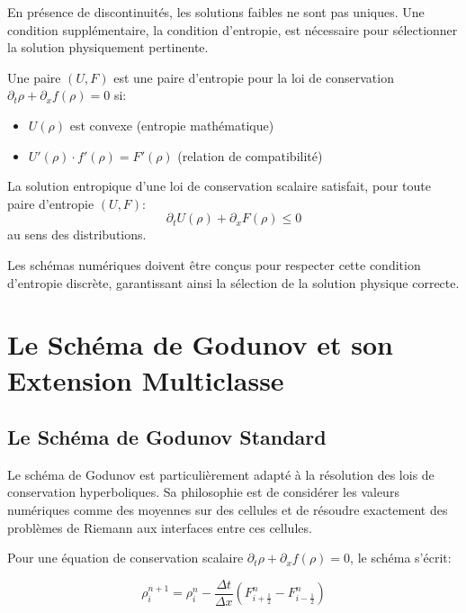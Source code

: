 En présence de discontinuités, les solutions faibles ne sont pas uniques. Une condition supplémentaire, la condition d'entropie, est nécessaire pour sélectionner la solution physiquement pertinente.

\begin{definition}
Une paire $(U, F)$ est une paire d'entropie pour la loi de conservation $\partial_t \rho + \partial_x f(\rho) = 0$ si:
\begin{itemize}
    \item $U(\rho)$ est convexe (entropie mathématique)
    \item $U'(\rho) \cdot f'(\rho) = F'(\rho)$ (relation de compatibilité)
\end{itemize}
\end{definition}

\begin{theorem}
La solution entropique d'une loi de conservation scalaire satisfait, pour toute paire d'entropie $(U,F)$:
\begin{equation}
\partial_t U(\rho) + \partial_x F(\rho) \leq 0
\end{equation}
au sens des distributions.
\end{theorem}

Les schémas numériques doivent être conçus pour respecter cette condition d'entropie discrète, garantissant ainsi la sélection de la solution physique correcte.

\section{Le Schéma de Godunov et son Extension Multiclasse}
\label{sec:schema_godunov}

\subsection{Le Schéma de Godunov Standard}
\label{subsec:godunov_standard}

Le schéma de Godunov \cite{godunov1959finite} est particulièrement adapté à la résolution des lois de conservation hyperboliques. Sa philosophie est de considérer les valeurs numériques comme des moyennes sur des cellules et de résoudre exactement des problèmes de Riemann aux interfaces entre ces cellules.

Pour une équation de conservation scalaire $\partial_t \rho + \partial_x f(\rho) = 0$, le schéma s'écrit:

\begin{equation}
\rho_i^{n+1} = \rho_i^n - \frac{\Delta t}{\Delta x} \left( F_{i+\frac{1}{2}}^n - F_{i-\frac{1}{2}}^n \right)
\end{equation}

